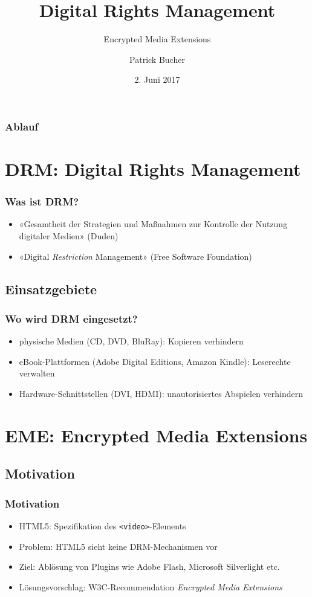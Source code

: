 \documentclass[aspectratio=169]{beamer}
\begin{document}
\title{Digital Rights Management}
\subtitle{Encrypted Media Extensions}
\author{Patrick Bucher}
\date{2. Juni 2017}
\maketitle

\begin{frame}
\frametitle{Ablauf}
\tableofcontents
\end{frame}

\section{DRM: Digital Rights Management}
\begin{frame}
\frametitle{Was ist DRM?}
\begin{itemize}
    \item{«Gesamtheit der Strategien und Maßnahmen zur Kontrolle der Nutzung digitaler Medien» (Duden)}
    \item{«Digital \textit{Restriction} Management» (Free Software Foundation)}
\end{itemize}
\end{frame}

\subsection{Einsatzgebiete}
\begin{frame}
\frametitle{Wo wird DRM eingesetzt?}
\begin{itemize}
    \item{physische Medien (CD, DVD, BluRay): Kopieren verhindern}
    \item{eBook-Plattformen (Adobe Digital Editions, Amazon Kindle): Leserechte verwalten}
    \item{Hardware-Schnittstellen (DVI, HDMI): unautorisiertes Abspielen verhindern}
\end{itemize}
\end{frame}

\section{EME: Encrypted Media Extensions}

\subsection{Motivation}
\begin{frame}
\frametitle{Motivation}
\begin{itemize}
    \item{HTML5: Spezifikation des \texttt{<video>}-Elements}
    \item{Problem: HTML5 sieht keine DRM-Mechanismen vor}
    \item{Ziel: Ablösung von Plugins wie Adobe Flash, Microsoft Silverlight etc.}
    \item{Lösungsvorschlag: W3C-Recommendation \textit{Encrypted Media Extensions}}
\end{itemize}
\end{frame}
\end{document}
